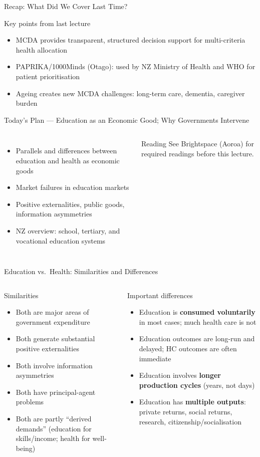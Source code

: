 \documentclass[aspectratio=169, 12pt]{beamer}
\newcommand{\recapslide}[1]{%
  \begin{frame}{Recap: What Did We Cover Last Time?}
    \begin{block}{Key points from last lecture}
      \begin{itemize}#1\end{itemize}
    \end{block}
  \end{frame}}
\newcommand{\planslide}[2]{%
  \begin{frame}{Today's Plan — #1}
    \begin{columns}
      \column{0.6\textwidth}
      \begin{itemize}#2\end{itemize}
      \column{0.38\textwidth}
      \begin{alertblock}{Reading}
        \footnotesize See Brightspace (Aoroa) for required readings before this lecture.
      \end{alertblock}
    \end{columns}
  \end{frame}}
\begin{document}
\recapslide{
  \item MCDA provides transparent, structured decision support for multi-criteria health allocation
  \item PAPRIKA/1000Minds (Otago): used by NZ Ministry of Health and WHO for patient prioritisation
  \item Ageing creates new MCDA challenges: long-term care, dementia, caregiver burden
}

\planslide{Education as an Economic Good; Why Governments Intervene}{
  \item Parallels and differences between education and health as economic goods
  \item Market failures in education markets
  \item Positive externalities, public goods, information asymmetries
  \item NZ overview: school, tertiary, and vocational education systems
}

\begin{frame}{Education vs.\ Health: Similarities and Differences}
  \begin{columns}
      \begin{block}{Similarities}
        \begin{itemize}
          \item Both are major areas of government expenditure
          \item Both generate substantial positive externalities
          \item Both involve information asymmetries
          \item Both have principal-agent problems
          \item Both are partly ``derived demands'' (education for skills/income; health for well-being)
        \end{itemize}
      \end{block}
      \begin{alertblock}{Important differences}
        \begin{itemize}
          \item Education is \textbf{consumed voluntarily} in most cases; much health care is not
          \item Education outcomes are long-run and delayed; HC outcomes are often immediate
          \item Education involves \textbf{longer production cycles} (years, not days)
          \item Education has \textbf{multiple outputs}: private returns, social returns, research,
                citizenship/socialisation
        \end{itemize}
      \end{alertblock}
  \end{columns}
\end{frame}
\end{document}
